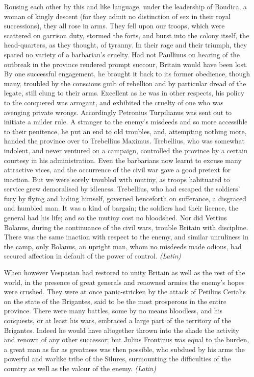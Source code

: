 
Rousing each other by this and like language, under the leadership of Boudica, a woman of kingly descent (for they admit no distinction of sex in their royal successions), they all rose in arms. They fell upon our troops, which were scattered on garrison duty, stormed the forts, and burst into the colony itself, the head-quarters, as they thought, of tyranny. In their rage and their triumph, they spared no variety of a barbarian's cruelty. Had not Paullinus on hearing of the outbreak in the province rendered prompt succour, Britain would have been lost. By one successful engagement, he brought it back to its former obedience, though many, troubled by the conscious guilt of rebellion and by particular dread of the legate, still clung to their arms. Excellent as he was in other respects, his policy to the conquered was arrogant, and exhibited the cruelty of one who was avenging private wrongs. Accordingly Petronius Turpilianus was sent out to initiate a milder rule. A stranger to the enemy's misdeeds and so more accessible to their penitence, he put an end to old troubles, and, attempting nothing more, handed the province over to Trebellius Maximus. Trebellius, who was somewhat indolent, and never ventured on a campaign, controlled the province by a certain courtesy in his administration. Even the barbarians now learnt to excuse many attractive vices, and the occurrence of the civil war gave a good pretext for inaction. But we were sorely troubled with mutiny, as troops habituated to service grew demoralised by idleness. Trebellius, who had escaped the soldiers' fury by flying and hiding himself, governed henceforth on sufferance, a disgraced and humbled man. It was a kind of bargain; the soldiers had their licence, the general had his life; and so the mutiny cost no bloodshed. Nor did Vettius Bolanus, during the continuance of the civil wars, trouble Britain with discipline. There was the same inaction with respect to the enemy, and similar unruliness in the camp, only Bolanus, an upright man, whom no misdeeds made odious, had secured affection in default of the power of control. \emph{(Latin)}


When however Vespasian had restored to unity Britain as well as the rest of the world, in the presence of great generals and renowned armies the enemy's hopes were crushed. They were at once panic-stricken by the attack of Petilius Cerialis on the state of the Brigantes, said to be the most prosperous in the entire province. There were many battles, some by no means bloodless, and his conquests, or at least his wars, embraced a large part of the territory of the Brigantes. Indeed he would have altogether thrown into the shade the activity and renown of any other successor; but Julius Frontinus was equal to the burden, a great man as far as greatness was then possible, who subdued by his arms the powerful and warlike tribe of the Silures, surmounting the difficulties of the country as well as the valour of the enemy. \emph{(Latin)}

